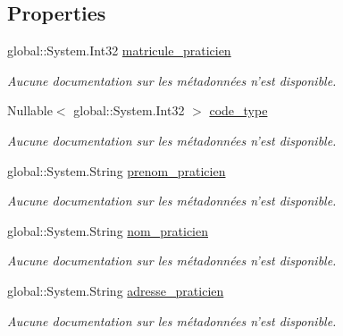 \subsection*{Properties}
\begin{DoxyCompactItemize}
\item 
global\-::\-System.\-Int32 \hyperlink{class_model_1_1_p_r_a_t_i_c_i_e_n_abe4fab1270371ef15fc1342a8d048d26}{matricule\-\_\-praticien}
\begin{DoxyCompactList}\small\item\em Aucune documentation sur les métadonnées n'est disponible. \end{DoxyCompactList}\item 
Nullable$<$ global\-::\-System.\-Int32 $>$ \hyperlink{class_model_1_1_p_r_a_t_i_c_i_e_n_ab93a1451efbd3e55b088b40837f035b5}{code\-\_\-type}
\begin{DoxyCompactList}\small\item\em Aucune documentation sur les métadonnées n'est disponible. \end{DoxyCompactList}\item 
global\-::\-System.\-String \hyperlink{class_model_1_1_p_r_a_t_i_c_i_e_n_a2fa0f78d1573fe2d7d39d0a18feced05}{prenom\-\_\-praticien}
\begin{DoxyCompactList}\small\item\em Aucune documentation sur les métadonnées n'est disponible. \end{DoxyCompactList}\item 
global\-::\-System.\-String \hyperlink{class_model_1_1_p_r_a_t_i_c_i_e_n_aebc5f079e73aca7fde020d817a1be78d}{nom\-\_\-praticien}
\begin{DoxyCompactList}\small\item\em Aucune documentation sur les métadonnées n'est disponible. \end{DoxyCompactList}\item 
global\-::\-System.\-String \hyperlink{class_model_1_1_p_r_a_t_i_c_i_e_n_af65b1cb99d1ba84d1f1a3c9d4ff96637}{adresse\-\_\-praticien}
\begin{DoxyCompactList}\small\item\em Aucune documentation sur les métadonnées n'est disponible. \end{DoxyCompactList}\item 

\end{DoxyCompactItemize}
